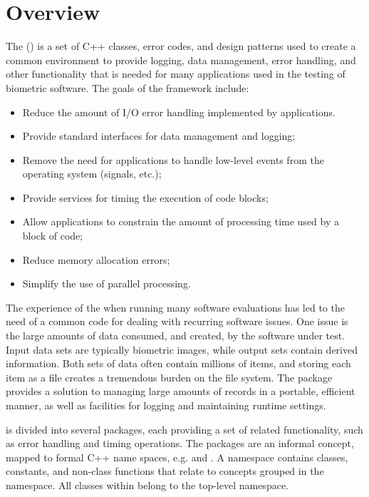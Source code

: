 \chapter{Overview}

The \lname (\sname)
is a set of C++\cite{cpp:plguide} classes, error codes, and design
patterns used to create a common environment to provide logging, data
management, error handling, and other functionality that is needed for many
applications used in the testing of biometric software. The goals of the
framework include:
\begin{itemize}
\item Reduce the amount of I/O error handling implemented by applications.
\item Provide standard interfaces for data management and logging;
\item Remove the need for applications to handle low-level events from the
operating system (signals, etc.);
\item Provide services for timing the execution of code blocks;
\item Allow applications to constrain the amount of processing time used
by a block of code;
\item Reduce memory allocation errors;
\item Simplify the use of parallel processing.
\end{itemize}

The experience of the \nistig when running many software evaluations has led
to the need of a common code for dealing with recurring software issues. One
issue is the large amounts of data consumed, and created, by the software
under test. Input data sets are typically biometric images, while output sets
contain derived information. Both sets of data often contain millions of
items, and storing each item as a file creates a tremendous burden on the file
system. The  package provides a solution to
managing large amounts of records in a portable, efficient manner, as well as 
facilities for logging and maintaining runtime settings.

\sname is divided into several packages, each providing a set of
related functionality, such as error handling and timing operations. The
packages are an informal concept, mapped to formal C++ name spaces, e.g.
 and . A namespace contains classes, constants,
and non-class functions that relate to concepts grouped in the namespace.
All classes within \sname belong to the top-level 
namespace.

